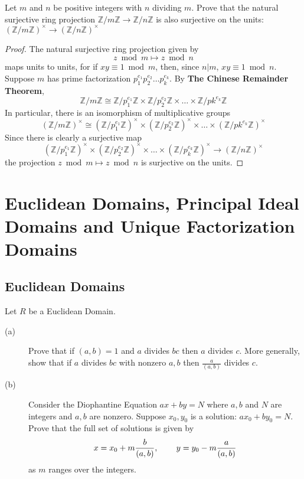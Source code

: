 \documentclass[12pt,leqno]{book}
\numberwithin{equation}{section}
\newcommand{\question}[2] {\vspace{.25in}\noindent\fbox{#1} #2 \vspace{.10in}}
\theoremstyle{definition}
\begin{document}
\question{7}{Let $m$ and $n$ be positive integers with $n$ dividing $m$. Prove that the natural surjective ring projection $\mathbb{Z}/m\mathbb{Z}\to\mathbb{Z}/n\mathbb{Z}$ is also surjective on the units:$(\mathbb{Z}/m\mathbb{Z})^{\times}\to(\mathbb{Z}/n\mathbb{Z})^{\times}$}

\begin{proof}
 The natural surjective ring projection given by \[z\bmod{m}\mapsto z\bmod{n}\] maps units to units, for if $xy\equiv1\bmod{m}$, then, since $n|m$, $xy\equiv1\bmod{n}$. Suppose $m$ has prime factorization $p_1^{e_1}p_2^{e_2}\hdots p_k^{e_k}$. By \textbf{The Chinese Remainder Theorem}, \[\mathbb{Z}/m\mathbb{Z}\cong\mathbb{Z}/p_1^{e_1}\mathbb{Z}\times\mathbb{Z}/p_2^{e_2}\mathbb{Z}\times\hdots\times\mathbb{Z}/pk^{e_k}\mathbb{Z}\] In particular, there is an isomorphism of multiplicative groups \[\left(\mathbb{Z}/m\mathbb{Z}\right)^{\times}\cong\left(\mathbb{Z}/p_1^{e_1}\mathbb{Z}\right)^{\times}\times\left(\mathbb{Z}/p_2^{e_2}\mathbb{Z}\right)^{\times}\times\hdots\times\left(\mathbb{Z}/pk^{e_k}\mathbb{Z}\right)^{\times}\] Since there is clearly a surjective map \[\left(\mathbb{Z}/p_1^{e_1}\mathbb{Z}\right)^{\times}\times\left(\mathbb{Z}/p_2^{e_2}\mathbb{Z}\right)^{\times}\times\hdots\times\left(\mathbb{Z}/p_k^{e_k}\mathbb{Z}\right)^{\times}\to\left(\mathbb{Z}/n\mathbb{Z}\right)^{\times}\] the projection $z\bmod{m}\mapsto z\bmod{n}$ is surjective on the units.
\end{proof}

\chapter{Euclidean Domains, Principal Ideal Domains and Unique Factorization Domains}
\section{Euclidean Domains}

\question{4}{Let $R$ be a Euclidean Domain.}
\begin{description}
 \item [(a)] Prove that if $(a,b)=1$ and $a$ divides $bc$ then $a$ divides $c$. More generally, show that if $a$ divides $bc$ with nonzero $a,b$ then $\frac{a}{(a,b)}$ divides $c$.
 \item [(b)] Consider the Diophantine Equation $ax+by=N$ where $a,b$ and $N$ are integers and $a,b$ are nonzero. Suppose $x_0,y_0$ is a solution: $ax_0+by_0=N$. Prove that the full set of solutions is given by \[x=x_0+m\frac{b}{(a,b)},\hskip.3in y=y_0-m\frac{a}{(a,b)}\]as $m$ ranges over the integers.  
\end{description}
\end{document}
